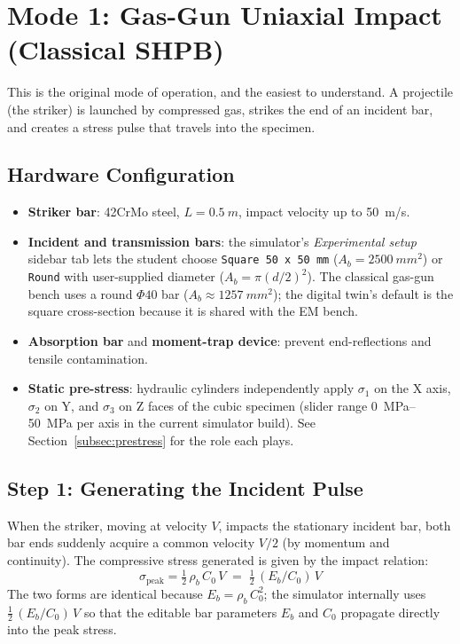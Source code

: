\documentclass[11pt,a4paper]{article}
\providecommand{\SI}[2]{\qty{#1}{#2}}
\providecommand{\SIrange}[3]{\qtyrange{#1}{#2}{#3}}
\newcommand{\sig}{\sigma}
\newcommand{\Cz}{C_0}
\newcommand{\Ab}{A_b}
\newcommand{\sigpeak}{\sig_{\text{peak}}}
\begin{document}
\newpage
\section{Mode 1: Gas-Gun Uniaxial Impact (Classical SHPB)}

This is the original mode of operation, and the easiest to understand. A
projectile (the striker) is launched by compressed gas, strikes the end of an
incident bar, and creates a stress pulse that travels into the specimen.

\subsection{Hardware Configuration}

\begin{itemize}[leftmargin=*, itemsep=2pt]
  \item \textbf{Striker bar}: 42CrMo steel, $L = \SI{0.5}{m}$,
        impact velocity up to \SI{50}{m/s}.
  \item \textbf{Incident and transmission bars}: the simulator's
        \emph{Experimental setup} sidebar tab lets the student choose
        \texttt{Square 50 x 50 mm} ($\Ab = \SI{2500}{mm^2}$) or
        \texttt{Round} with user-supplied diameter
        ($\Ab = \pi (d/2)^2$). The classical gas-gun bench uses a round
        $\Phi 40$ bar ($\Ab \approx \SI{1257}{mm^2}$); the digital
        twin's default is the square cross-section because it is shared with
        the EM bench.
  \item \textbf{Absorption bar} and \textbf{moment-trap device}: prevent
        end-reflections and tensile contamination.
  \item \textbf{Static pre-stress}: hydraulic cylinders independently apply
        $\sig_1$ on the X axis, $\sig_2$ on Y, and $\sig_3$ on Z faces of the
        cubic specimen (slider range \SIrange{0}{50}{MPa} per axis in the
        current simulator build). See Section~\ref{subsec:prestress} for the
        role each plays.
\end{itemize}

\subsection{Step 1: Generating the Incident Pulse}

When the striker, moving at velocity $V$, impacts the stationary incident bar,
both bar ends suddenly acquire a common velocity $V/2$ (by momentum and
continuity). The compressive stress generated is given by the impact relation:
\begin{equation}
  \boxed{\;\sigpeak = \tfrac{1}{2}\,\rho_b\,\Cz\,V \;=\; \tfrac{1}{2}\,(E_b/\Cz)\,V\;}
  \label{eq:gungauge}
\end{equation}
The two forms are identical because $E_b = \rho_b\,\Cz^2$; the simulator
internally uses $\tfrac{1}{2}\,(E_b/\Cz)\,V$ so that the editable bar parameters
$E_b$ and $\Cz$ propagate directly into the peak stress.
\end{document}
